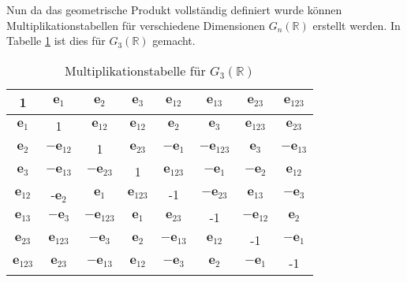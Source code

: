 Nun da das geometrische Produkt vollständig definiert wurde können Multiplikationstabellen für verschiedene Dimensionen $G_n(\mathbb{R})$ erstellt werden. In Tabelle \ref{tab:multip} ist dies für  $G_3(\mathbb{R})$ gemacht.
\begin{table}
    \label{tab:multip}
    \begin{center}
    \begin{tabular}{ |c|ccc|ccc|c| } 
     \hline
     1 & $\textbf{e}_1$ & $\textbf{e}_2$ &$\textbf{e}_3$ & $\textbf{e}_{12}$ & $\textbf{e}_{13}$ & $\textbf{e}_{23}$ & $\textbf{e}_{123}$\\
     \hline
     $\textbf{e}_1$ & 1 & $\textbf{e}_{12}$ & $\textbf{e}_{12}$ & $\textbf{e}_2$ & $\textbf{e}_3$ & $\textbf{e}_{123}$ & $\textbf{e}_{23}$\\
     $\textbf{e}_2$ & $-\textbf{e}_{12}$ & 1 & $\textbf{e}_{23}$ & $-\textbf{e}_1$ & $-\textbf{e}_{123}$ & $\textbf{e}_3$ & $-\textbf{e}_{13}$\\
     $\textbf{e}_3$ & $-\textbf{e}_{13}$ & $-\textbf{e}_{23}$ & 1 & $\textbf{e}_{123}$ & $-\textbf{e}_1$ & $-\textbf{e}_2$ & $\textbf{e}_{12}$\\
     \hline
     $\textbf{e}_{12}$ & -$\textbf{e}_2$ & $\textbf{e}_1$& $\textbf{e}_{123}$ & -1 & $-\textbf{e}_{23}$ & $\textbf{e}_{13}$ &  $-\textbf{e}_{3}$\\
     $\textbf{e}_{13}$ & $-\textbf{e}_{3}$ & $-\textbf{e}_{123}$ & $\textbf{e}_{1}$ & $\textbf{e}_{23}$ & -1 & $-\textbf{e}_{12}$ &  $\textbf{e}_{2}$\\
     $\textbf{e}_{23}$ &  $\textbf{e}_{123}$ & $-\textbf{e}_{3}$ & $\textbf{e}_{2}$ & $-\textbf{e}_{13}$ & $\textbf{e}_{12}$ & -1 & $-\textbf{e}_{1}$ \\
     \hline
     $\textbf{e}_{123}$ & $\textbf{e}_{23}$ & $-\textbf{e}_{13}$ & $\textbf{e}_{12}$ & $-\textbf{e}_{3}$& $\textbf{e}_{2}$ & $-\textbf{e}_{1}$ & -1 \\
     \hline
    \end{tabular}
    \end{center}
 	\caption{Multiplikationstabelle für $G_3(\mathbb{R})$}
\end{table}
